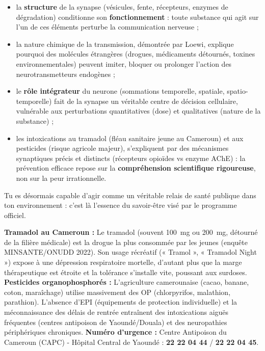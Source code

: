 \documentclass[11pt]{article}
\newcommand{\cle}[1]{{\popxbold\color{popdark}#1}}
\begin{document}
\begin{itemize}
\item la \textbf{structure} de la synapse (vésicules, fente, récepteurs, enzymes de dégradation) conditionne son \textbf{fonctionnement} : toute substance qui agit sur l'un de ces éléments perturbe la communication nerveuse ;
\item la nature \cle{chimique} de la transmission, démontrée par Loewi, explique pourquoi des molécules étrangères (drogues, médicaments détournés, toxines environnementales) peuvent imiter, bloquer ou prolonger l'action des neurotransmetteurs endogènes ;
\item le \textbf{rôle intégrateur} du neurone (sommations temporelle, spatiale, spatio-temporelle) fait de la synapse un véritable centre de décision cellulaire, vulnérable aux perturbations quantitatives (dose) et qualitatives (nature de la substance) ;
\item les intoxications au tramadol (fléau sanitaire jeune au Cameroun) et aux pesticides (risque agricole majeur), s'expliquent par des mécanismes synaptiques précis et distincts (récepteurs opioïdes vs enzyme AChE) : la prévention efficace repose sur la \textbf{compréhension scientifique rigoureuse}, non sur la peur irrationnelle.
\end{itemize}

Tu es désormais capable d'agir comme un véritable relais de santé publique dans ton environnement : c'est là l'essence du \cle{savoir-être} visé par le programme officiel.

\begin{savaistu}
\textbf{Tramadol au Cameroun :} Le tramadol (souvent \SI{100}{mg} ou \SI{200}{mg}, détourné de la filière médicale) est la drogue la plus consommée par les jeunes (enquête MINSANTE/ONUDD 2022). Son usage récréatif (« Tramol », « Tramadol Night ») expose à une dépression respiratoire mortelle, d'autant plus que la marge thérapeutique est étroite et la tolérance s'installe vite, poussant aux surdoses.
\textbf{Pesticides organophosphorés :} L'agriculture camerounaise (cacao, banane, coton, maraîchage) utilise massivement des OP (chlorpyrifos, malathion, parathion). L'absence d'EPI (équipements de protection individuelle) et la méconnaissance des délais de rentrée entraînent des intoxications aiguës fréquentes (centres antipoison de Yaoundé/Douala) et des neuropathies périphériques chroniques.
\textbf{Numéro d'urgence :} Centre Antipoison du Cameroun (CAPC) - Hôpital Central de Yaoundé : \textbf{22 22 04 44} / \textbf{22 22 04 45}.
\end{savaistu}
\end{document}
